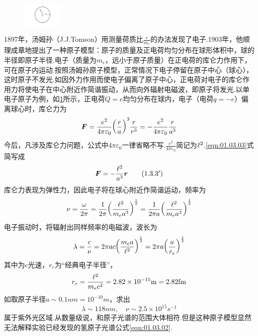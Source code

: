 \begin{figure}
	\centering
	\includegraphics[width=2cm,clip]{QM file/figure/1-4}
	\caption{}
	\label{fig.1-4}
\end{figure}
1897年，汤姆孙（J.J.Tomson）用测量荷质比$\frac{e}{m_{e}}$的办法发现了电子.1903年，他顺理成章地提出了一种原子模型：原子的质量及正电荷均匀分布在球形体积中，球的半径即原子半径.电子（质量为$m_{e}$，远小于原子质量）在正电荷的库仑力作用下，可在原子内运动.按照汤姆孙原子模型，正常情况下电子停留在原子中心（球心），这时原子不发光.如因外力作用而使电子偏离了原子中心，正电荷对电子的库仑作用力将使电子在中心附近作简谐振动，从而向外辐射电磁波，即原子将发光.以单电子原子为例，如\ref{fig.1-4}所示，正电荷$Q=e$均匀分布在球内，电子（电荷$q=-e$）偏离球心时，库仑力为
\eqlong
\begin{equation}\label{eqn:01.03.03}
	\boldsymbol{F}=\-\frac{e^{2}}{4\pi\varepsilon_{0}}\bigg(\frac{r}{a} \bigg)^{3} \frac{r}{r^{3}}=-\frac{e^{2}}{4\pi\varepsilon_{0}}\frac{r}{a^{3}}
\end{equation}\eqnormal
今后，凡涉及库仑力问题，公式中$4\pi\varepsilon_{0}$一律省略不写.$\frac{e^{2}}{4\pi\varepsilon_{0}}$简记为$\e^{2}$.\eqref{eqn:01.03.03}式简写成
\eqshort
\begin{equation*}\label{eqn:01.03.03'}
	\boldsymbol{F}=-\frac{\e^{2}}{a^{3}} \boldsymbol{r} \tag{$1.3.3^{\prime}$}
\end{equation*}\eqnormal
库仑力表现为弹性力，因此电子将在球心附近作简谐运动，频率为
\eqlong
\begin{equation}\label{eqn:01.03.04}
	\nu=\frac{\omega}{2\pi}=\frac{1}{2\pi}\bigg(\frac{\e^2}{m_{e}a^3} \bigg)^{\frac{1}{2}}=\frac{1}{2\pi a}\bigg(\frac{\e^2}{m_{e}a^3} \bigg)^{\frac{1}{2}}
\end{equation}
电子振动时，将辐射出同样频率的电磁波，波长为
\begin{equation}\label{eqn:01.03.05}
	\lambda=\frac{c}{\nu}=2\pi ac\bigg(\frac{m_{e}a}{\e^2} \bigg)^{\frac{1}{2}}=2\pi a\bigg(\frac{a}{r_{e}} \bigg)^{\frac{1}{2}}
\end{equation}
其中为c光速，$r_{e}$为“经典电子半径”，
\begin{equation}\label{eqn:01.03.06}
	r_{e}=\frac{\e^2}{m_{e}c^{2}}=2.82\times10^{-15} \si{m}=2.82 \si{fm}
\end{equation}\eqnormal
如取原子半径$a\sim 0.1 \si{nm}=10^{-10} \si{m}$，求出
\begin{equation*}
	\lambda \sim 118 \si{nm},\quad \nu\sim 2.5\times10^{15} \si{s^{-1}}
\end{equation*}
属于紫外光区域.从数量级说，和原子光谱的范围大体相符.但是这种原子模型显然无法解释实验已经发现的氢原子光谱公式\eqref{eqn:01.03.02}.

